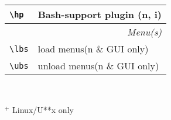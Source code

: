 \documentclass[oneside,12pt,a4paper,DIV18]{scrartcl}
\begin{document}
\begin{center}
\begin{tabular}[]{|p{11mm}|p{59mm}|}
\hline \verb'\hp'  & Bash-support plugin             \hfill (n, i) \\
\hline 
\hline
\multicolumn{2}{|r|}{\textsl{Menu(s)}}\\
\hline \verb'\lbs'  & load    menus\hfill \scriptsize{(n \& GUI only)}\\
\hline \verb'\ubs'  & unload  menus\hfill \scriptsize{(n \& GUI only)}\\
\hline 
\end{tabular} \\ [5.0ex]
\vfill
\begin{flushleft}
\hspace{5mm}$^+$ \footnotesize{Linux/U**x only}
\end{flushleft}
\end{center}
\end{document}
